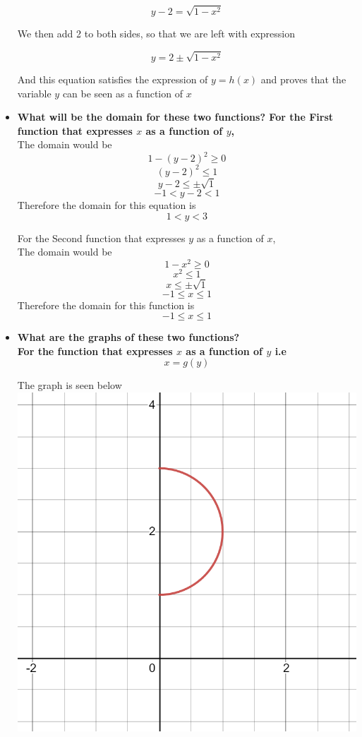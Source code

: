 \documentclass{article}
\begin{document}
\begin{itemize}
    $${y-2 = \sqrt{1 - x^2}}$$
    
    We then add 2 to both sides, so that we are left with expression
    
    $${y = 2 \pm\sqrt{1 - x^2}}$$
    
    And this equation satisfies the expression of ${y=h(x)}$
    and proves that the variable ${y}$ can be seen as a function of ${x}$
    
    \item \textbf{What will be the domain for these two functions? 
    For the First function that expresses ${x}$ as a function of ${y}$,}\\
    The domain would be
    $${1-(y-2)^2 \ge 0}$$
    $${(y-2)^2 \le 1}$$
    $${{y-2\le\pm\sqrt{1}}}$$
    $${-1 < y-2 <1}$$
    Therefore the domain for this equation is $${1 < y < 3}$$
    
    
    For the Second function that expresses ${y}$ as a function of ${x}$,\\
    The domain would be
    $${1-x^2 \ge 0}$$
    $${x^2 \le 1}$$
    $${{x\le\pm\sqrt{1}}}$$
    $${-1 \le x \le 1}$$
    Therefore the domain for this function is $${-1\le x \le 1}$$

    \item \textbf{What are the graphs of these two functions?\\
    For the function that expresses ${x}$ as a function of ${y}$ i.e}
    $${x=g(y)}$$
    
    The graph is seen below\\    
    \includegraphics[scale = 0.3]{x-graph}
    

\end{itemize}
\end{document}

